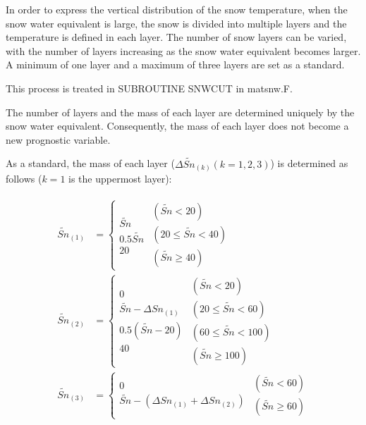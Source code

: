 In order to express the vertical distribution of the snow temperature, when the snow water equivalent is large, the snow is divided into multiple layers and the temperature is defined in each layer.
The number of snow layers can be varied, with the number of layers increasing as the snow water equivalent becomes larger. A minimum of one layer and a maximum of three layers are set as a standard.

This process is treated in SUBROUTINE SNWCUT in matsnw.F.

The number of layers and the mass of each layer are determined uniquely by the snow water equivalent. Consequently, the mass of each layer does not become a new prognostic variable.

As a standard, the mass of each layer (\(\Delta {\widetilde{Sn}}_{(k)} (k=1,2,3)\)) is determined as follows (\(k=1\) is the uppermost layer):

\begin{eqnarray}
\begin{aligned}
\widetilde{Sn}_{(1)} &= \left\{
\begin{array}{ll}
 \widetilde{Sn} \\
 0.5\widetilde{Sn}  \\
 20
\end{array}
\begin{array}{ll}
 (\widetilde{Sn} < 20) \\
 (20 \leq \widetilde{Sn} < 40) \\
 (\widetilde{Sn} \geq 40)
\end{array}
\right. \\
\widetilde{Sn}_{(2)} &= \left\{
\begin{array}{ll}
 0 \\
 \widetilde{Sn} - \Delta Sn_{(1)} \\
 0.5(\widetilde{Sn} - 20) \\
 40
\end{array}
\begin{array}{ll}
 (\widetilde{Sn} < 20) \\
 (20 \leq \widetilde{Sn} < 60) \\
 (60 \leq \widetilde{Sn} < 100) \\
 (\widetilde{Sn} \geq 100)
\end{array}
\right. \\
\widetilde{Sn}_{(3)} &= \left\{
\begin{array}{ll}
 0 \\
 \widetilde{Sn} - (\Delta Sn_{(1)} + \Delta Sn_{(2)})
\end{array}
\begin{array}{ll}
 (\widetilde{Sn} < 60) \\
 (\widetilde{Sn} \geq 60)
\end{array}
\right.
\end{aligned} \label{8-9}
\end{eqnarray}

